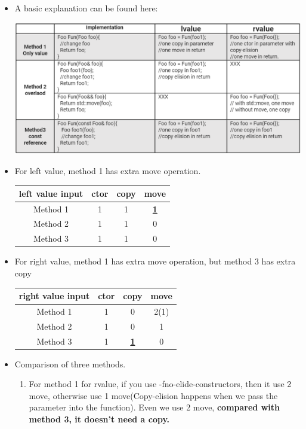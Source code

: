 \documentclass[a4paper,11pt,twoside]{book}
\begin{document}
\begin{itemize}
\item A basic explanation can be found here: \\
\begin{center}
	\includegraphics[scale=0.5]{pics/copy1.png}
\end{center}

\item For left value, method 1 has extra move operation.

\begin{tabular}{|c|c|c|c|}
	\hline
	left value input	& ctor & copy & move  \\
	\hline
	Method 1 & 1 & 1 & \textbf{\underline{1}} \\
	\hline
	Method 2&  1& 1 & 0  \\
	\hline
	Method 3&  1&  1& 0 \\
	\hline
\end{tabular}

\item For right value, method 1 has extra move operation, but method 3 has extra copy

\begin{tabular}{|c|c|c|c|}
	\hline
	right value input	& ctor & copy & move  \\
	\hline
	Method 1 & 1 & 0 & 2(1)  \\
	\hline
	Method 2 & 1 & 0 & 1 \\
	\hline
	Method 3 & 1 & \textbf{\underline{1}} & 0 \\
	\hline
\end{tabular}


\item Comparison of three methods. 
\begin{enumerate}
	\item For method 1 for rvalue,  if you use -fno-elide-constructors, then it use 2 move, otherwise use 1 move(Copy-elision happens when we pass the parameter into the function). Even we use 2 move, \textbf{compared with method 3, it doesn't need a copy.}
	

\end{enumerate}
\end{itemize}
\end{document}
